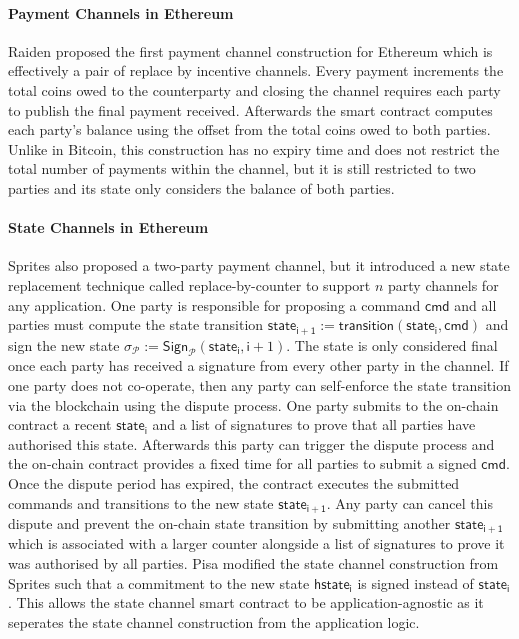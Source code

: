 \documentclass{llncs}
\newcommand{\cmd}{\mathsf{cmd}}
\newcommand{\hstatei}{\mathsf{hstate}_{\monotoniccounter}}
\newcommand{\monotoniccounter}{\mathsf{i}}
\newcommand{\stateinfoi}{\mathsf{state}_{\mathsf{i}}}
\newcommand{\stateinfoplus}{\mathsf{state}_{\mathsf{i+1}}}
\newcommand{\participant}{\mathcal{P}}
\newcommand{\sign}{\mathsf{Sign}}
\begin{document}
\paragraph{Payment Channels in Ethereum}
Raiden proposed the first payment channel construction for Ethereum which is effectively a pair of replace by incentive channels. 
Every payment increments the total coins owed to the counterparty and closing the channel requires each party to publish the final payment received. 
Afterwards the smart contract computes each party's balance using the offset from the total coins owed to both parties. 
Unlike in Bitcoin, this construction has no expiry time and does not restrict the total number of payments within the channel, but it is still restricted to two parties and its state only considers the balance of both parties. 

\paragraph{State Channels in Ethereum} 

Sprites also proposed a two-party payment channel, but it introduced a new state replacement technique called replace-by-counter to support $n$ party channels for any application.
One party is responsible for proposing a command $\cmd$ and all parties must  compute the state transition $\stateinfoplus := \mathsf{transition}(\stateinfoi, \cmd)$ and sign the new state $\sigma_{\participant} := \sign_{\participant}(\stateinfoi, \monotoniccounter+1)$.
The state is only considered final once each party has received a signature from every other party in the channel. 
If one party does not co-operate, then any party can self-enforce the state transition via the blockchain using the dispute process. 
One party submits to the on-chain contract a recent $\stateinfoi$ and a list of signatures to prove that all parties have authorised this state.
Afterwards this party can trigger the dispute process and the on-chain contract provides a fixed time for all parties to submit a signed $\cmd$. 
Once the dispute period has expired, the contract executes the submitted commands and transitions to the new state $\stateinfoplus$. 
Any party can cancel this dispute and prevent the on-chain state transition by submitting another $\stateinfoplus$ which is associated with a larger counter alongside a list of signatures to prove it was authorised by all parties. 
Pisa modified the state channel construction from Sprites such that a commitment to the new state $\hstatei$ is signed instead of $\stateinfoi$.
This allows the state channel smart contract to be application-agnostic as it seperates the state channel construction from the application logic. 
\end{document}
